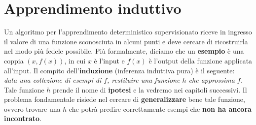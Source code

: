 \section{Apprendimento induttivo}
Un algoritmo per l'apprendimento deterministico supervisionato riceve in ingresso il valore di una funzione sconosciuta in alcuni punti e deve cercare di ricostruirla nel modo più fedele possibile. Più formalmente, diciamo che un \textbf{esempio} è una coppia $(x, f(x))$, in cui $x$ è l'input e $f(x)$ è l'output della funzione applicata all'input. Il compito dell'\textbf{induzione} (inferenza induttiva pura) è il seguente:\\
\textit{data una collezione di esempi di $f$, restituire una funzione $h$ che approssima $f$.}\\
Tale funzione $h$ prende il nome di \textbf{ipotesi} e la vedremo nei capitoli successivi. Il problema fondamentale risiede nel cercare di \textbf{generalizzare} bene tale funzione, ovvero trovare una $h$ che potrà predire correttamente esempi che \textbf{non ha ancora incontrato}. 
\newpage
